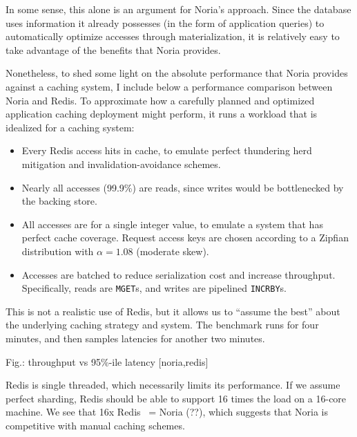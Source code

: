 In some sense, this alone is an argument for Noria's approach. Since the
database uses information it already possesses (in the form of
application queries) to automatically optimize accesses through
materialization, it is relatively easy to take advantage of the benefits
that Noria provides.

Nonetheless, to shed some light on the absolute performance that Noria
provides against a caching system, I include below a performance
comparison between Noria and Redis. To approximate how a carefully
planned and optimized application caching deployment might perform, it
runs a workload that is idealized for a caching system:

\begin{itemize}
 \item Every Redis access hits in cache, to emulate perfect thundering herd
   mitigation and invalidation-avoidance schemes.
 \item Nearly all accesses (99.9\%) are reads, since writes would be
   bottlenecked by the backing store.
 \item All accesses are for a single integer value, to emulate a system that has
   perfect cache coverage. Request access keys are chosen according to a Zipfian
    distribution with $\alpha = 1.08$ (moderate skew).
 \item Accesses are batched to reduce serialization cost and increase
   throughput. Specifically, reads are \texttt{MGET}s, and writes are pipelined
    \texttt{INCRBY}s.
\end{itemize}

This is not a realistic use of Redis, but it allows us to ``assume the best''
about the underlying caching strategy and system. The benchmark runs for four
minutes, and then samples latencies for another two minutes.

Fig.: throughput vs 95\%-ile latency [noria,redis]

Redis is single threaded, which necessarily limits its performance. If we assume
perfect sharding, Redis should be able to support 16 times the load on a 16-core
machine. We see that 16x Redis ~= Noria (??), which suggests that Noria is
competitive with manual caching schemes.
